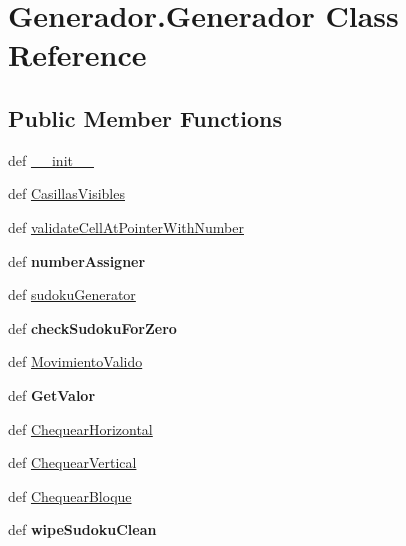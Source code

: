 \hypertarget{class_generador_1_1_generador}{\section{Generador.\-Generador Class Reference}
\label{class_generador_1_1_generador}
}
\subsection*{Public Member Functions}
\begin{DoxyCompactItemize}
\item 
def \hyperlink{class_generador_1_1_generador_a7653a28c2b949a33513e269c80fce22a}{\-\_\-\-\_\-init\-\_\-\-\_\-}
\item 
def \hyperlink{class_generador_1_1_generador_ab5129fee0d088ea23d9fd2a85a73506d}{Casillas\-Visibles}
\item 
def \hyperlink{class_generador_1_1_generador_aef145f37afe0cb9cd9cd6832c0f8ccd9}{validate\-Cell\-At\-Pointer\-With\-Number}
\item 
\hypertarget{class_generador_1_1_generador_ae5ece4fd0d0526f261ee964587f5bd83}{def {\bfseries number\-Assigner}}\label{class_generador_1_1_generador_ae5ece4fd0d0526f261ee964587f5bd83}

\item 
def \hyperlink{class_generador_1_1_generador_af4c2ef52fe2543bdfea778a5a7e6ee7f}{sudoku\-Generator}
\item 
\hypertarget{class_generador_1_1_generador_a96ddfcf197c4b980dacdcad5c52cc5eb}{def {\bfseries check\-Sudoku\-For\-Zero}}\label{class_generador_1_1_generador_a96ddfcf197c4b980dacdcad5c52cc5eb}

\item 
def \hyperlink{class_generador_1_1_generador_afe624fd14668a68697dd8be2c9bddbe1}{Movimiento\-Valido}
\item 
\hypertarget{class_generador_1_1_generador_ab817a51c7982e956a6a1d6e40bae9e60}{def {\bfseries Get\-Valor}}\label{class_generador_1_1_generador_ab817a51c7982e956a6a1d6e40bae9e60}

\item 
def \hyperlink{class_generador_1_1_generador_aa143e691cf3301a3ff0a1bc3a56bd172}{Chequear\-Horizontal}
\item 
def \hyperlink{class_generador_1_1_generador_af5fa571c200c831435c9614b7369c62b}{Chequear\-Vertical}
\item 
def \hyperlink{class_generador_1_1_generador_aa641c9a08ddfbc84486a0504808fc436}{Chequear\-Bloque}
\item 
\hypertarget{class_generador_1_1_generador_aa935397ae17f757fe5d502b5d81c054e}{def {\bfseries wipe\-Sudoku\-Clean}}\label{class_generador_1_1_generador_aa935397ae17f757fe5d502b5d81c054e}

\end{DoxyCompactItemize}
